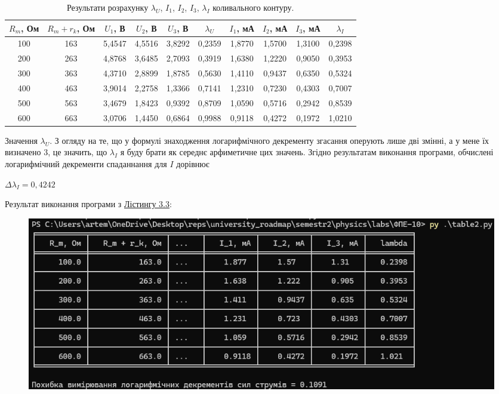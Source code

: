 \documentclass[12pt,a4paper]{article}
\begin{document}
    \begin{table}[h!]
        \centering
        \renewcommand{\arraystretch}{1.2} %
        \begin{tabular}{|c|c|c|c|c|c|c|c|c|c|}
            \hline
            $R_m$, Ом & $R_m + r_k$, Ом & $U_1$, В & $U_2$, В & $U_3$, В & $\lambda_U$ & $I_1$, мА & $I_2$, мА & $I_3$, мА & $\lambda_I$ \\ [3pt]
            \hline
            100 & 163 & 5,4547 & 4,5516 & 3,8292 & 0,2359 & 1,8770 & 1,5700 & 1,3100 & 0,2398 \\[3pt]
            200 & 263 & 4,8768 & 3,6485 & 2,7093 & 0,3919 & 1,6380 & 1,2220 & 0,9050 & 0,3953 \\[3pt]
            300 & 363 & 4,3710 & 2,8899 & 1,8785 & 0,5630 & 1,4110 & 0,9437 & 0,6350 & 0,5324 \\[3pt]
            400 & 463 & 3,9014 & 2,2758 & 1,3366 & 0,7141 & 1,2310 & 0,7230 & 0,4303 & 0,7007 \\[3pt]
            500 & 563 & 3,4679 & 1,8423 & 0,9392 & 0,8709 & 1,0590 & 0,5716 & 0,2942 & 0,8539 \\[3pt]
            600 & 663 & 3,0706 & 1,4450 & 0,6864 & 0,9988 & 0,9118 & 0,4272 & 0,1972 & 1,0210 \\[3pt]
            \hline
        \end{tabular}
        \caption{Результати розрахунку $\lambda_U$, $I_1$, $I_2$, $I_3$, $\lambda_I$ коливального контуру.}
    \end{table}

    Значення $\lambda_U$. З огляду на те, що у формулі знаходження логарифмічного декременту згасання оперують лише дві змінні, а у мене їх визначено 3, це значить, що $\lambda_I$ я буду брати як середнє
    арфиметичне цих значень. Згідно результатам виконання програми, обчислені логарифмічний декременти спаданнання для $I$ дорівнює

    \begin{center}
        $\Delta \lambda_I = 0,4242$
    \end{center}

    \setlength{\parindent}{0pt}

    Результат виконання програми з \hyperlink{listing3}{Лістингу 3.3}:

    \begin{figure}[ht]
        \includegraphics[width=1\textwidth]{table2.png}
    \end{figure}
\end{document}
